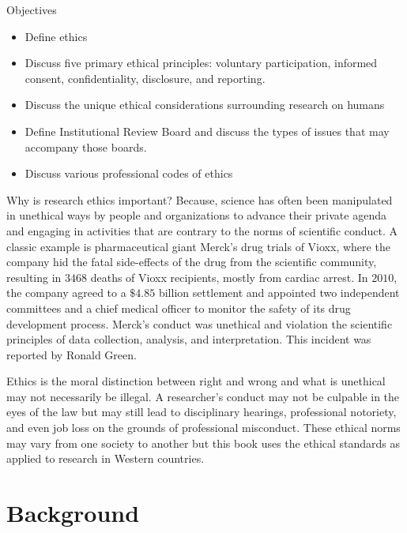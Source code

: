 \begin{center}
	\begin{objbox}{Objectives}
		\begin{itemize}
			\setlength{\itemsep}{0pt}
			\setlength{\parskip}{0pt}
			\setlength{\parsep}{0pt}
			
			\item Define ethics
			\item Discuss five primary ethical principles: voluntary participation, informed consent, confidentiality, disclosure, and reporting.
			\item Discuss the unique ethical considerations surrounding research on humans
			\item Define Institutional Review Board and discuss the types of issues that may accompany those boards.			
			\item Discuss various professional codes of ethics
		\end{itemize}
	\end{objbox}
\end{center}

Why is research ethics important? Because, science has often been manipulated in unethical ways by people and organizations to advance their private agenda and engaging in activities that are contrary to the norms of scientific conduct. A classic example is pharmaceutical giant Merck’s drug trials of Vioxx, where the company hid the fatal side-effects of the drug from the scientific community, resulting in $ 3468 $ deaths of Vioxx recipients, mostly from cardiac arrest. In $ 2010 $, the company agreed to a $ \$4.85 $ billion settlement and appointed two independent committees and a chief medical officer to monitor the safety of its drug development process. Merck's conduct was unethical and violation the scientific principles of data collection, analysis, and interpretation. This incident was reported by Ronald Green\cite{green2006direct}.

Ethics is the moral distinction between right and wrong and what is unethical may not necessarily be illegal. A researcher's conduct may not be culpable in the eyes of the law but may still lead to disciplinary hearings, professional notoriety, and even job loss on the grounds of professional misconduct. These ethical norms may vary from one society to another but this book uses the ethical standards as applied to research in Western countries.

\section{Background}

